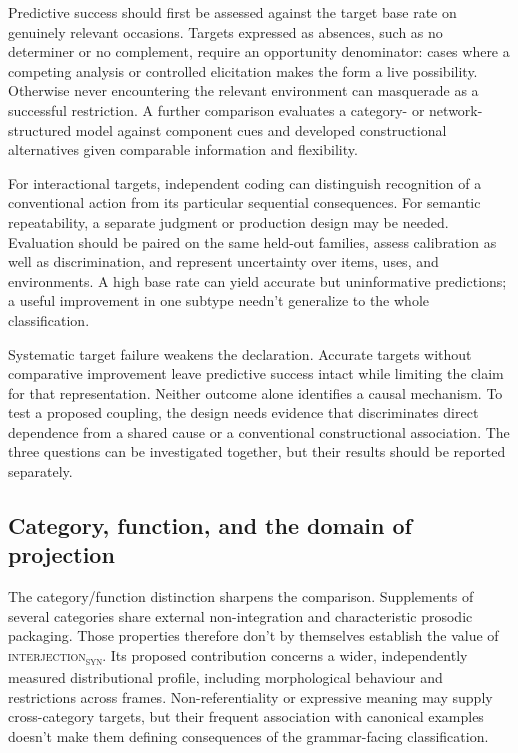 \documentclass[12pt]{article}
\newcommand{\intj}[1]{\textsc{interjection\textsubscript{#1}}}
\begin{document}
Predictive success should first be assessed against the target base rate on genuinely relevant occasions. Targets expressed as absences, such as no determiner or no complement, require an opportunity denominator: cases where a competing analysis or controlled elicitation makes the form a live possibility. Otherwise never encountering the relevant environment can masquerade as a successful restriction. A further comparison evaluates a category- or network-structured model against component cues and developed constructional alternatives given comparable information and flexibility.

For interactional targets, independent coding can distinguish recognition of a conventional action from its particular sequential consequences. For semantic repeatability, a separate judgment or production design may be needed. Evaluation should be paired on the same held-out families, assess calibration as well as discrimination, and represent uncertainty over items, uses, and environments. A high base rate can yield accurate but uninformative predictions; a useful improvement in one subtype needn't generalize to the whole classification.

Systematic target failure weakens the declaration. Accurate targets without comparative improvement leave predictive success intact while limiting the claim for that representation. Neither outcome alone identifies a causal mechanism. To test a proposed coupling, the design needs evidence that discriminates direct dependence from a shared cause or a conventional constructional association. The three questions can be investigated together, but their results should be reported separately.

\subsection{Category, function, and the domain of projection}\label{sec:proj-domain}

The category/function distinction sharpens the comparison. Supplements of several categories share external non-integration and characteristic prosodic packaging. Those properties therefore don't by themselves establish the value of \intj{syn}. Its proposed contribution concerns a wider, independently measured distributional profile, including morphological behaviour and restrictions across frames. Non-referentiality or expressive meaning may supply cross-category targets, but their frequent association with canonical examples doesn't make them defining consequences of the grammar-facing classification.
\end{document}
